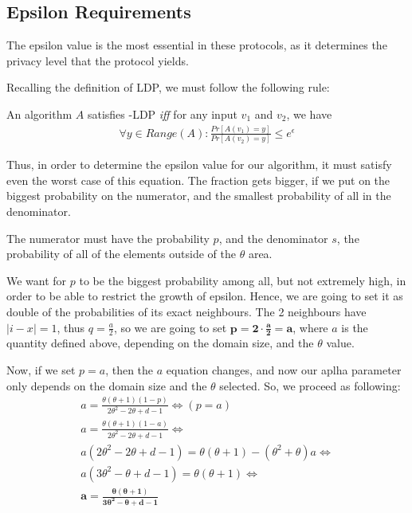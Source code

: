 \subsection{Epsilon Requirements}

The epsilon value is the most essential in these protocols, as it determines the privacy level that the protocol yields.

Recalling the definition of LDP, we must follow the following rule:

\begin{center}
An algorithm $A$ satisfies \espilon-LDP \textit{iff} for any input $v_1$ and $v_2$, we have
\begin{align*}
    \forall y \in Range(A): \frac{Pr[A(v_1) = y]}{Pr[A(v_2) = y]} \leq e^{\epsilon}
\end{align*}
    
\end{center}

Thus, in order to determine the epsilon value for our algorithm, it must satisfy even the worst case of this equation. The fraction gets bigger, if we put on the biggest probability on the numerator, and the smallest probability of all in the denominator. 

The numerator must have the probability $p$, and the denominator $s$, the probability of all of the elements outside of the $\theta$ area. 

We want for $p$ to be the biggest probability among all, but not extremely high, in order to be able to restrict the growth of epsilon. Hence, we are going to set it as double of the probabilities of its exact neighbours. The 2 neighbours have $|i-x| = 1$, thus $q = \frac{a}{2}$, so we are going to set $\mathbf{p = 2 \cdot \frac{a}{2} = a}$, where $a$ is the quantity defined above, depending on the domain size, and the $\theta$ value.

Now, if we set $p = a$, then the $a$ equation changes, and now our aplha parameter only depends on the domain size and the $\theta$ selected. So, we proceed as following:
\begin{align*}
    a = \frac{\theta(\theta + 1) (1 - p)}{2\theta^2 - 2\theta + d - 1} \Longleftrightarrow{(p = a)}\\
    a = \frac{\theta(\theta + 1) (1 - a)}{2\theta^2 - 2\theta + d - 1} \Longleftrightarrow \\
    a (2\theta^2 - 2\theta + d - 1) = \theta(\theta + 1) - (\theta^2 + \theta)a \Longleftrightarrow\\
    a (3\theta^2 - \theta + d - 1) = \theta(\theta + 1) \Longleftrightarrow \\
    \mathbf{a = \frac{\theta(\theta + 1)}{3\theta^2 - \theta + d - 1}}
\end{align*}

